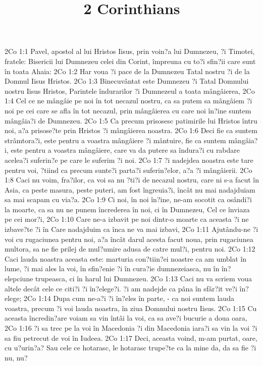 

\title{2 Corinthians}

2Co 1:1  Pavel, apostol al lui Hristos Iisus, prin voin?a lui Dumnezeu, ?i Timotei, fratele: Bisericii lui Dumnezeu celei din Corint, împreuna cu to?i sfin?ii care sunt în toata Ahaia:
2Co 1:2  Har voua ?i pace de la Dumnezeu Tatal nostru ?i de la Domnul Iisus Hristos.
2Co 1:3  Binecuvântat este Dumnezeu ?i Tatal Domnului nostru Iisus Hristos, Parintele îndurarilor ?i Dumnezeul a toata mângâierea,
2Co 1:4  Cel ce ne mângâie pe noi în tot necazul nostru, ca sa putem sa mângâiem ?i noi pe cei care se afla în tot necazul, prin mângâierea cu care noi în?ine suntem mângâia?i de Dumnezeu.
2Co 1:5  Ca precum prisosesc patimirile lui Hristos întru noi, a?a prisose?te prin Hristos ?i mângâierea noastra.
2Co 1:6  Deci fie ca suntem strâmtora?i, este pentru a voastra mângâiere ?i mântuire, fie ca suntem mângâia?i, este pentru a voastra mângâiere, care va da putere sa îndura?i cu rabdare acelea?i suferin?e pe care le suferim ?i noi.
2Co 1:7  ?i nadejdea noastra este tare pentru voi, ?tiind ca precum sunte?i parta?i suferin?elor, a?a ?i mângâierii.
2Co 1:8  Caci nu voim, fra?ilor, ca voi sa nu ?ti?i de necazul nostru, care ni s-a facut în Asia, ca peste masura, peste puteri, am fost îngreuia?i, încât nu mai nadajduiam sa mai scapam cu via?a.
2Co 1:9  Ci noi, în noi în?ine, ne-am socotit ca osândi?i la moarte, ca sa nu ne punem încrederea în noi, ci în Dumnezeu, Cel ce înviaza pe cei mor?i,
2Co 1:10  Care ne-a izbavit pe noi dintr-o moarte ca aceasta ?i ne izbave?te ?i în Care nadajduim ca înca ne va mai izbavi,
2Co 1:11  Ajutându-ne ?i voi cu rugaciunea pentru noi, a?a încât darul acesta facut noua, prin rugaciunea multora, sa ne fie prilej de mul?umire adusa de catre mul?i, pentru noi.
2Co 1:12  Caci lauda noastra aceasta este: marturia con?tiin?ei noastre ca am umblat în lume, ?i mai ales la voi, în sfin?enie ?i în cura?ie dumnezeiasca, nu în în?elepciune trupeasca, ci în harul lui Dumnezeu.
2Co 1:13  Caci nu va scriem voua altele decât cele ce citi?i ?i în?elege?i. ?i am nadejde ca pâna în sfâr?it ve?i în?elege;
2Co 1:14  Dupa cum ne-a?i ?i în?eles în parte, - ca noi suntem lauda voastra, precum ?i voi lauda noastra, în ziua Domnului nostru Iisus.
2Co 1:15  Cu aceasta încredin?are voiam sa vin întâi la voi, ca sa ave?i bucurie a doua oara,
2Co 1:16  ?i sa trec pe la voi în Macedonia ?i din Macedonia iara?i sa vin la voi ?i sa fiu petrecut de voi în Iudeea.
2Co 1:17  Deci, aceasta voind, m-am purtat, oare, cu u?urin?a? Sau cele ce hotarasc, le hotarasc trupe?te ca la mine da, da sa fie ?i nu, nu?
